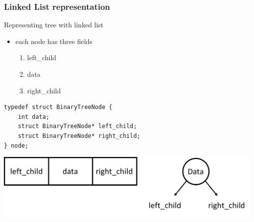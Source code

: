 \documentclass[newPxFont,sthlmFooter,nooffset]{beamer}
\begin{document}
\begin{frame}[t, fragile]
  \frametitle{Linked List representation}
Representing tree with linked list
\begin{itemize}
\item each node has three fields
  \begin{enumerate}
  \item left\_child
  \item data
  \item right\_child
  \end{enumerate}
\end{itemize}

\begin{lstlisting}
typedef struct BinaryTreeNode {
    int data;
    struct BinaryTreeNode* left_child;
    struct BinaryTreeNode* right_child;
} node;
\end{lstlisting}
\begin{center}
        \includegraphics[height=0.2\textheight]{figures/fig08_linked_list.png}
\end{center}
\end{frame}
\end{document}
